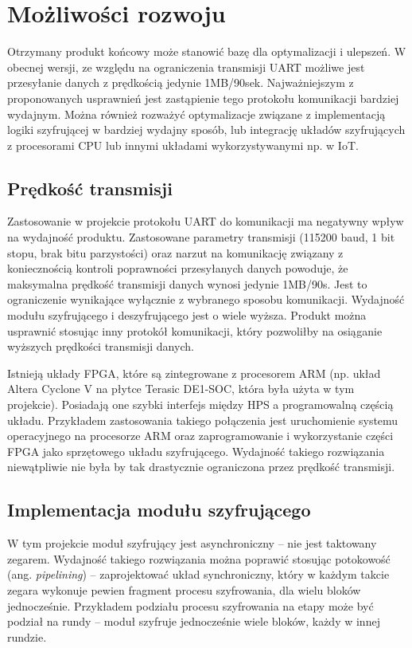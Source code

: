 \section{Możliwości rozwoju}
Otrzymany produkt końcowy może stanowić bazę dla optymalizacji i ulepszeń. W obecnej wersji, ze względu na ograniczenia transmisji UART możliwe jest przesyłanie danych z prędkością jedynie 1MB/90sek. Najważniejszym z proponowanych usprawnień jest zastąpienie tego protokołu komunikacji bardziej wydajnym. Można również rozważyć optymalizacje związane z implementacją logiki szyfrującej w bardziej wydajny sposób, lub integrację układów szyfrujących z procesorami CPU lub innymi układami wykorzystywanymi np. w IoT.

\subsection{Prędkość transmisji}
Zastosowanie w projekcie protokołu UART do komunikacji ma negatywny wpływ na wydajność produktu. Zastosowane parametry transmisji (115200 baud, 1 bit stopu, brak bitu parzystości) oraz narzut na komunikację związany z koniecznością kontroli poprawności przesyłanych danych powoduje, że maksymalna prędkość transmisji danych wynosi jedynie 1MB/90s. Jest to ograniczenie wynikające wyłącznie z wybranego sposobu komunikacji. Wydajność modułu szyfrującego i deszyfrującego jest o wiele wyższa. Produkt można usprawnić stosując inny protokół komunikacji, który pozwoliłby na osiąganie wyższych prędkości transmisji danych.

Istnieją układy FPGA, które są zintegrowane z procesorem ARM (np. układ Altera Cyclone V na płytce Terasic DE1-SOC, która była użyta w tym projekcie). Posiadają one szybki interfejs między HPS a programowalną częścią układu. Przykładem zastosowania takiego połączenia jest uruchomienie systemu operacyjnego na procesorze ARM oraz zaprogramowanie i wykorzystanie części FPGA jako sprzętowego układu szyfrującego. Wydajność takiego rozwiązania niewątpliwie nie była by tak drastycznie ograniczona przez prędkość transmisji.

\subsection{Implementacja modułu szyfrującego}
W tym projekcie moduł szyfrujący jest asynchroniczny -- nie jest taktowany zegarem. Wydajność takiego rozwiązania można poprawić stosując potokowość (ang. \textit{pipelining}) -- zaprojektować układ synchroniczny, który w każdym takcie zegara wykonuje pewien fragment procesu szyfrowania, dla wielu bloków jednocześnie. Przykładem podziału procesu szyfrowania na etapy może być podział na rundy -- moduł szyfruje jednocześnie wiele bloków, każdy w innej rundzie.

